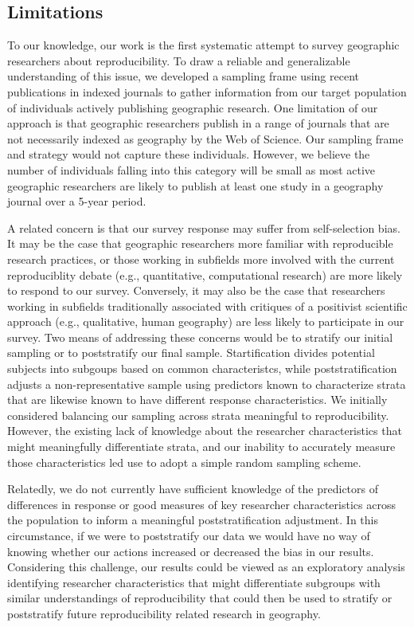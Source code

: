 \documentclass[]{interact}
\theoremstyle{plain}%
\theoremstyle{definition}
\theoremstyle{remark}
\begin{document}
\subsection*{Limitations}
To our knowledge, our work is the first systematic attempt to survey geographic researchers about reproducibility. 
To draw a reliable and generalizable understanding of this issue, we developed a sampling frame using recent publications in indexed journals to gather information from our target population of individuals actively publishing geographic research. 
One limitation of our approach is that geographic researchers publish in a range of journals that are not necessarily indexed as geography by the Web of Science. 
Our sampling frame and strategy would not capture these individuals. 
However, we believe the number of individuals falling into this category will be small as most active geographic researchers are likely to publish at least one study in a geography journal over a 5-year period.

A related concern is that our survey response may suffer from self-selection bias. 
It may be the case that geographic researchers more familiar with reproducible research practices, or those working in subfields more involved with the current reproduciblity debate (e.g., quantitative, computational research) are more likely to respond to our survey. 
Conversely, it may also be the case that researchers working in subfields traditionally associated with critiques of a positivist scientific approach (e.g., qualitative, human geography) are less likely to participate in our survey. 
Two means of addressing these concerns would be to stratify our initial sampling or to poststratify our final sample.
Startification divides potential subjects into subgoups based on common characteristcs, while poststratification adjusts a non-representative sample using predictors known to characterize strata that are likewise known to have different response characteristics. 
We initially considered balancing our sampling across strata meaningful to reproducibility. 
However, the existing lack of knowledge about the researcher characteristics that might meaningfully differentiate strata, and our inability to accurately measure those characteristics led use to adopt a simple random sampling scheme.

Relatedly, we do not currently have sufficient knowledge of the predictors of differences in response or good measures of key researcher characteristics across the population to inform a meaningful poststratification adjustment. 
In this circumstance, if we were to poststratify our data we would have no way of knowing whether our actions increased or decreased the bias in our results. 
Considering this challenge, our results could be viewed as an exploratory analysis identifying researcher characteristics that might differentiate subgroups with similar understandings of reproducibility that could then be used to stratify or poststratify future reproducibility related research in geography.   
\end{document}
